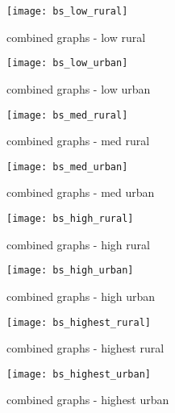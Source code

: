 \documentclass[12pt,letterpaper]{article}
\begin{document}
\begin{figure}
\centering
\texttt{[image: bs\_low\_rural]}
\caption{combined graphs - low rural}
\label{fig:spacing_low_rural}
\end{figure}

\begin{figure}
\centering
\texttt{[image: bs\_low\_urban]}
\caption{combined graphs - low urban}
\label{fig:spacing_low_urban}
\end{figure}

\begin{figure}
\centering
\texttt{[image: bs\_med\_rural]}
\caption{combined graphs - med rural}
\label{fig:spacing_med_rural}
\end{figure}

\begin{figure}
\centering
\texttt{[image: bs\_med\_urban]}
\caption{combined graphs - med urban}
\label{fig:spacing_med_urban}
\end{figure}

\begin{figure}
\centering
\texttt{[image: bs\_high\_rural]}
\caption{combined graphs - high rural}
\label{fig:spacing_high_rural}
\end{figure}

\begin{figure}
\centering
\texttt{[image: bs\_high\_urban]}
\caption{combined graphs - high urban}
\label{fig:spacing_high_urban}
\end{figure}

\begin{figure}
\centering
\texttt{[image: bs\_highest\_rural]}
\caption{combined graphs - highest rural}
\label{fig:spacing_highest_rural}
\end{figure}

\begin{figure}
\centering
\texttt{[image: bs\_highest\_urban]}
\caption{combined graphs - highest urban}
\label{fig:spacing_highest_urban}
\end{figure}

\end{document}
